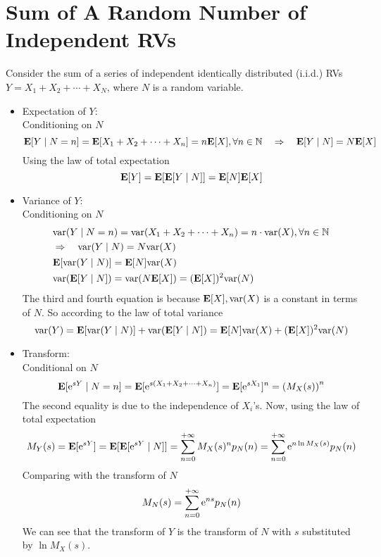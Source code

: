 \section{Sum of A Random Number of Independent RVs}
Consider the sum of a series of independent identically distributed (i.i.d.) RVs $Y = X_1 + X_2 + \cdots + X_N$, where $N$ is a random variable. 
\begin{itemize}
    \item Expectation of $Y$: \\ 
    Conditioning on $N$
    \begin{equation}
        \mathbf{E}[Y \mid N = n] = \mathbf{E}[X_1 + X_2 + \cdots + X_n] = n \mathbf{E}[X], \forall n \in \mathbb{N} \quad\Rightarrow\quad \mathbf{E}[Y \mid N] = N \mathbf{E}[X]
    \end{equation}
    Using the law of total expectation
    \begin{equation}
        \mathbf{E}[Y] = \mathbf{E}[\mathbf{E}[Y \mid N]] = \mathbf{E}[N] \mathbf{E}[X]
    \end{equation}
    \item Variance of $Y$: \\
    Conditioning on $N$
    \begin{align}
        &\begin{aligned}
            &\mathrm{var}(Y \mid N = n) = \mathrm{var}(X_1 + X_2 + \cdots + X_n) = n \cdot \mathrm{var}(X), \forall n \in \mathbb{N} \\ 
            &\Rightarrow\quad \mathrm{var}(Y \mid N) = N \mathrm{var}(X) 
        \end{aligned} \\
        &\mathbf{E}[\mathrm{var}(Y \mid N)] = \mathbf{E}[N] \mathrm{var}(X) \\ 
        &\mathrm{var}(\mathbf{E}[Y \mid N]) = \mathrm{var}(N \mathbf{E}[X]) = (\mathbf{E}[X])^2 \mathrm{var}(N) 
    \end{align}
    The third and fourth equation is because $\mathbf{E}[X], \mathrm{var}(X)$ is a constant in terms of $N$. So according to the law of total variance
    \begin{equation}
        \mathrm{var}(Y) = \mathbf{E}[\mathrm{var}(Y \mid N)] + \mathrm{var}(\mathbf{E}[Y \mid N]) = \mathbf{E}[N] \mathrm{var}(X) + (\mathbf{E}[X])^2 \mathrm{var}(N)
    \end{equation}
    \item Transform: \\ 
    Conditional on $N$
    \begin{equation}
        \mathbf{E}[\mathrm{e}^{sY} \mid N = n] = \mathbf{E}[\mathrm{e}^{s(X_1 + X_2 + \cdots + X_n)}] = \mathbf{E}[\mathrm{e}^{sX_1}]^n = \qty(M_{X}(s))^n
    \end{equation}
    The second equality is due to the independence of $X_i$'s. Now, using the law of total expectation
    \begin{equation}
        M_{Y}(s) = \mathbf{E}[\mathrm{e}^{sY}] = \mathbf{E}[\mathbf{E}[\mathrm{e}^{sY} \mid N]] = \sum_{n=0}^{+\infty} M_{X}(s)^n p_N(n) = \sum_{n=0}^{+\infty} \mathrm{e}^{n \ln M_{X}(s)} p_{N}(n)
    \end{equation}
    Comparing with the transform of $N$
    \begin{equation}
        M_{N}(s) = \sum_{n=0}^{+\infty} \mathrm{e}^{ns} p_{N}(n)
    \end{equation}
    We can see that the transform of $Y$ is the transform of $N$ with $s$ substituted by $\ln M_{X}(s)$.
 \end{itemize}
